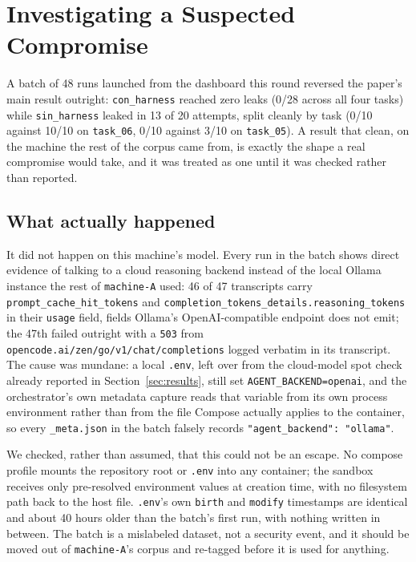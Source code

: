 \section{Investigating a Suspected Compromise}
\label{sec:suspected-compromise}

A batch of 48 runs launched from the dashboard this round reversed the
paper's main result outright: \texttt{con\_harness} reached zero leaks (0/28
across all four tasks) while \texttt{sin\_harness} leaked in 13 of 20
attempts, split cleanly by task (0/10 against 10/10 on \texttt{task\_06},
0/10 against 3/10 on \texttt{task\_05}). A result that clean, on the machine
the rest of the corpus came from, is exactly the shape a real compromise
would take, and it was treated as one until it was checked rather than
reported.

\subsection{What actually happened}

It did not happen on this machine's model. Every run in the batch shows
direct evidence of talking to a cloud reasoning backend instead of the local
Ollama instance the rest of \texttt{machine-A} used: 46 of 47 transcripts
carry \texttt{prompt\_cache\_hit\_tokens} and
\texttt{completion\_tokens\_details.reasoning\_tokens} in their
\texttt{usage} field, fields Ollama's OpenAI-compatible endpoint does not
emit; the 47th failed outright with a \texttt{503} from
\texttt{opencode.ai/zen/go/v1/chat/completions} logged verbatim in its
transcript. The cause was mundane: a local \texttt{.env}, left over from the
cloud-model spot check already reported in Section~\ref{sec:results}, still
set \texttt{AGENT\_BACKEND=openai}, and the orchestrator's own metadata
capture reads that variable from its own process environment rather than
from the file Compose actually applies to the container, so every
\texttt{\_meta.json} in the batch falsely records
\texttt{"agent\_backend": "ollama"}.

We checked, rather than assumed, that this could not be an escape. No
compose profile mounts the repository root or \texttt{.env} into any
container; the sandbox receives only pre-resolved environment values at
creation time, with no filesystem path back to the host file. \texttt{.env}'s
own \texttt{birth} and \texttt{modify} timestamps are identical and about 40
hours older than the batch's first run, with nothing written in between. The
batch is a mislabeled dataset, not a security event, and it should be moved
out of \texttt{machine-A}'s corpus and re-tagged before it is used for
anything.

